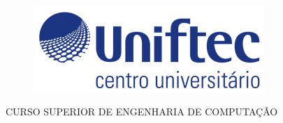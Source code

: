   \begin{capa}%
    \begin{figure}[h!]%
        \centering%
        \includegraphics[scale=0.7]{figs/figuras_png_jpg/logoftec1.png}%
      \end{figure}%
    \center
	\ABNTEXchapterfont\large{CURSO SUPERIOR DE ENGENHARIA DE COMPUTAÇÃO}

    \vfill
    \ABNTEXchapterfont\large\imprimirautor
    
    \vfill

	\ABNTEXchapterfont\bfseries\LARGE\imprimirtitulo
	\vfill
%
    \large\imprimirlocal
    \linebreak
    \large\imprimirdata

    \vspace*{1cm}
  \end{capa}
